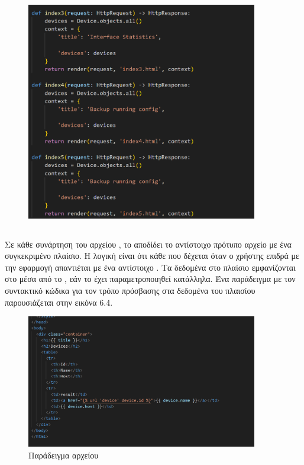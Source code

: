 \FloatBarrier

\begin{figure}[htb]
	\centering
	\includegraphics[width=0.9\textwidth]{graphics/viewspy.png}
	\caption{ }
\end{figure}

\FloatBarrier

\subsection{}
Σε κάθε συνάρτηση του αρχείου , το  αποδίδει το αντίστοιχο πρότυπο 
αρχείο με ένα συγκεκριμένο πλαίσιο. Η λογική είναι ότι κάθε  που δέχεται όταν ο χρήστης επιδρά με την εφαρμογή απαντιέται με ένα αντίστοιχο  . Τα δεδομένα στο πλαίσιο εμφανίζονται
στο  μέσα από το , εάν το  έχει παραμετροποιηθεί κατάλληλα. Ένα παράδειγμα  με
τον συντακτικό κώδικα για τον τρόπο πρόσβασης στα δεδομένα του πλαισίου παρουσιάζεται στην εικόνα 6.4.

\FloatBarrier

\begin{figure}[htb]
	\centering
	\includegraphics[width=0.9\textwidth]{graphics/html_template.png}
	\caption{Παράδειγμα  αρχείου }
\end{figure}

